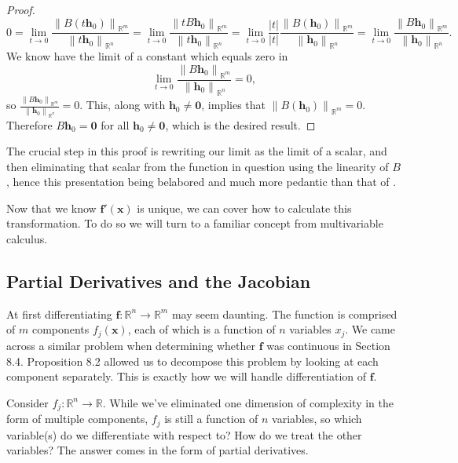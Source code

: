\documentclass{article}
\newcommand{\R}{\mathbb{R}}
\newcommand{\x}{\mathbf{x}}
\newcommand{\f}{\mathbf{f}}
\newcommand{\h}{\mathbf{h}}
\newcommand{\ze}{\mathbf{0}}
\newcommand{\norm}[1]{\left\lVert#1\right\rVert}
\theoremstyle{definition}
\begin{document}
\begin{proof}
$$ 0 = \lim\limits_{t\to 0}\frac{\norm{B(t\h_0)}_{\R^m}}{\norm{t\h_0}_{\R^n}} =  \lim\limits_{t\to 0}\frac{\norm{tB\h_0}_{\R^m}}{\norm{t\h_0}_{\R^n}}   =  \lim\limits_{t\to 0}\frac{|t|}{|t|}\frac{\norm{B(\h_0)}_{\R^m}}{\norm{\h_0}_{\R^n}} = \lim\limits_{t\to 0}\frac{\norm{B\h_0}_{\R^m}}{\norm{\h_0}_{\R^n}} .$$ We know have the limit of a constant which equals zero in 
$$  \lim\limits_{t\to 0}\frac{\norm{B\h_0}_{\R^m}}{\norm{\h_0}_{\R^n}} = 0 ,$$ so $ \frac{\norm{B\h_0}_{\R^m}}{\norm{\h_0}_{\R^n}} = 0$. This, along with $ \h_0\neq \ze $, implies that  $ \norm{B(\h_0)}_{\R^m} = 0$. Therefore $ B\h_0 = \ze $ for all $ \h_0\neq \ze $, which is the desired result. 
\end{proof}

The crucial step in this proof is rewriting our limit as the limit of a scalar, and then eliminating that scalar from the function in question using the linearity of $ B $, hence this presentation being belabored and much more pedantic than that of \cite{rudin1964principles}.  

Now that we know $ \f'(\x) $ is unique, we can cover how to calculate this transformation. To do so we will turn to a familiar concept from multivariable calculus. 

\subsection{Partial Derivatives and the Jacobian}
At first differentiating $ \f:\R^n\to\R^m $ may seem daunting. The function is comprised of $ m $ components $ f_j(\x) $, each of which is a function of $ n $ variables $ x_j $. We came across a similar problem when determining whether $ \f $ was continuous in Section 8.4. Proposition 8.2 allowed us to decompose this problem by looking at each component separately. This is exactly how we will handle differentiation of $ \f $. 

Consider $ f_j:\R^n\to \R $. While we've eliminated one dimension of complexity in the form of multiple components, $ f_j $ is still a function of $ n $ variables, so which variable(s) do we differentiate with respect to? How do we treat the other variables? The answer comes in the form of partial derivatives.
\end{document}
